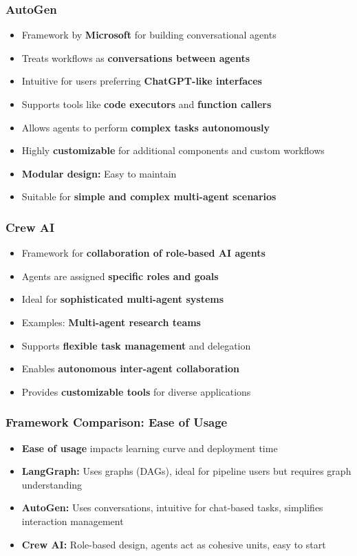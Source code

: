 \begin{frame}[fragile]\frametitle{AutoGen}
\begin{itemize}
    \item Framework by \textbf{Microsoft} for building conversational agents
    \item Treats workflows as \textbf{conversations between agents}
    \item Intuitive for users preferring \textbf{ChatGPT-like interfaces}
    \item Supports tools like \textbf{code executors} and \textbf{function callers}
    \item Allows agents to perform \textbf{complex tasks autonomously}
    \item Highly \textbf{customizable} for additional components and custom workflows
    \item \textbf{Modular design:} Easy to maintain
    \item Suitable for \textbf{simple and complex multi-agent scenarios}
\end{itemize}
\end{frame}

\begin{frame}[fragile]\frametitle{Crew AI}
\begin{itemize}
    \item Framework for \textbf{collaboration of role-based AI agents}
    \item Agents are assigned \textbf{specific roles and goals}
    \item Ideal for \textbf{sophisticated multi-agent systems}
    \item Examples: \textbf{Multi-agent research teams}
    \item Supports \textbf{flexible task management} and delegation
    \item Enables \textbf{autonomous inter-agent collaboration}
    \item Provides \textbf{customizable tools} for diverse applications
\end{itemize}
\end{frame}

\begin{frame}[fragile]\frametitle{Framework Comparison: Ease of Usage}
\begin{itemize}
    \item \textbf{Ease of usage} impacts learning curve and deployment time
    \item \textbf{LangGraph:} Uses graphs (DAGs), ideal for pipeline users but requires graph understanding
    \item \textbf{AutoGen:} Uses conversations, intuitive for chat-based tasks, simplifies interaction management
    \item \textbf{Crew AI:} Role-based design, agents act as cohesive units, easy to start
\end{itemize}
\end{frame}

